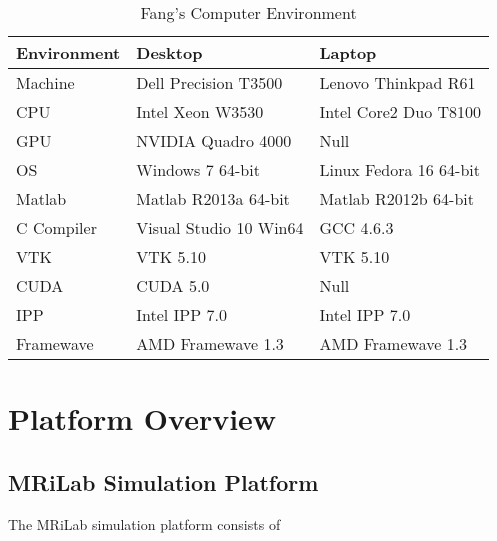 \documentclass{book}%
\begin{document}
\begin{table}[htbp]
	\centering
		\begin{tabular}{l l l}
	    \hline\hline
			Environment & Desktop & Laptop \\
			\hline
			Machine & Dell Precision T3500 & Lenovo Thinkpad R61 \\
			CPU & Intel Xeon W3530 & Intel Core2 Duo T8100 \\
			GPU & NVIDIA Quadro 4000 & Null \\
			OS  & Windows 7 64-bit & Linux Fedora 16 64-bit \\
			Matlab & Matlab R2013a 64-bit & Matlab R2012b 64-bit \\
			C Compiler & Visual Studio 10 Win64 & GCC 4.6.3 \\
			VTK & VTK 5.10 & VTK 5.10 \\
			CUDA & CUDA 5.0 & Null \\
			IPP & Intel IPP 7.0 & Intel IPP 7.0 \\
			Framewave & AMD Framewave 1.3 & AMD Framewave 1.3 \\
			\hline
		\end{tabular}
	\caption{Fang's Computer Environment}
	\label{tab:FangSComputerEnvironment}
\end{table}


\chapter{Platform Overview}
\section{MRiLab Simulation Platform}
The MRiLab simulation platform consists of 
\end{document}
